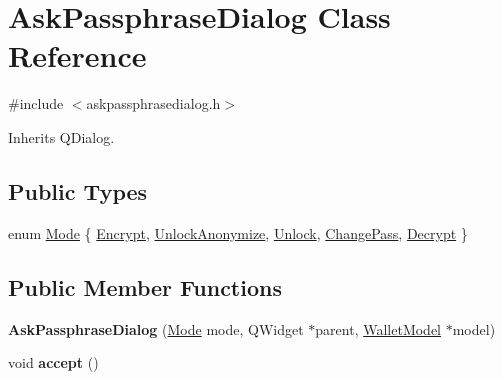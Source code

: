 \hypertarget{class_ask_passphrase_dialog}{}\section{Ask\+Passphrase\+Dialog Class Reference}
\label{class_ask_passphrase_dialog}


{\ttfamily \#include $<$askpassphrasedialog.\+h$>$}



Inherits Q\+Dialog.

\subsection*{Public Types}
\begin{DoxyCompactItemize}
\item 
enum \mbox{\hyperlink{class_ask_passphrase_dialog_a96abf4d3c36c1ef9e268fb546ae76538}{Mode}} \{ \newline
\mbox{\hyperlink{class_ask_passphrase_dialog_a96abf4d3c36c1ef9e268fb546ae76538a5894886141cada548b21488927acc467}{Encrypt}}, 
\mbox{\hyperlink{class_ask_passphrase_dialog_a96abf4d3c36c1ef9e268fb546ae76538abf838fdbee2ab76b043faed745c9ed7b}{Unlock\+Anonymize}}, 
\mbox{\hyperlink{class_ask_passphrase_dialog_a96abf4d3c36c1ef9e268fb546ae76538a2af79cac6134924405d6c620fb0f4c7e}{Unlock}}, 
\mbox{\hyperlink{class_ask_passphrase_dialog_a96abf4d3c36c1ef9e268fb546ae76538abc3f96ab0f90c0a3b0606407b4f662cc}{Change\+Pass}}, 
\newline
\mbox{\hyperlink{class_ask_passphrase_dialog_a96abf4d3c36c1ef9e268fb546ae76538aac5e2489527af224fc5e1316a77ba478}{Decrypt}}
 \}
\end{DoxyCompactItemize}
\subsection*{Public Member Functions}
\begin{DoxyCompactItemize}
\item 
\mbox{\label{class_ask_passphrase_dialog_aa178a465211ad6aa8cab642a295c244c}} 
{\bfseries Ask\+Passphrase\+Dialog} (\mbox{\hyperlink{class_ask_passphrase_dialog_a96abf4d3c36c1ef9e268fb546ae76538}{Mode}} mode, Q\+Widget $\ast$parent, \mbox{\hyperlink{class_wallet_model}{Wallet\+Model}} $\ast$model)
\item 
\mbox{\label{class_ask_passphrase_dialog_ac2f176af3693b73870d26ef0bfc6cbb9}} 
void {\bfseries accept} ()
\end{DoxyCompactItemize}
